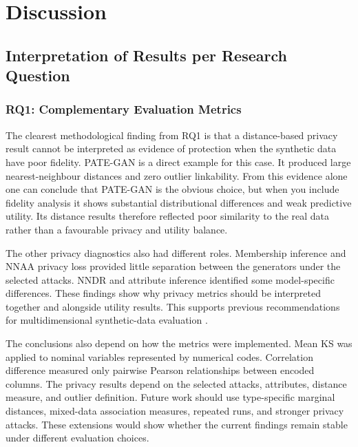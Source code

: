 
\chapter{Discussion}
\label{ch:discussion}


\section{Interpretation of Results per Research Question}
\label{sec:discussion:interpretation}

\subsection{RQ1: Complementary Evaluation Metrics}

The clearest methodological finding from RQ1 is that a
distance-based privacy result cannot be interpreted as evidence of
protection when the synthetic data have poor fidelity. PATE-GAN is
a direct example for this case. It produced large nearest-neighbour distances and zero
outlier linkability. From this evidence alone one can conclude that PATE-GAN
is the obvious choice, but when you include fidelity analysis it shows substantial distributional
differences and weak predictive utility. Its distance results therefore
reflected poor similarity to the real data rather than a
favourable privacy and utility balance.

The other privacy diagnostics also had different roles. Membership
inference and NNAA privacy loss provided little separation between the
generators under the selected attacks. NNDR and attribute inference
identified some model-specific differences. These findings show why
privacy metrics should be interpreted together and alongside utility
results. This supports previous recommendations for multidimensional
synthetic-data evaluation
\cite{hernandez2022synthetic,lautrup2025syntheval}.

The conclusions also depend on how the metrics were implemented. Mean KS
was applied to nominal variables represented by numerical codes.
Correlation difference measured only pairwise Pearson relationships
between encoded columns. The privacy results depend on the selected
attacks, attributes, distance measure, and outlier definition. Future
work should use type-specific marginal distances, mixed-data association
measures, repeated runs, and stronger privacy attacks. These extensions
would show whether the current findings remain stable under different
evaluation choices.

